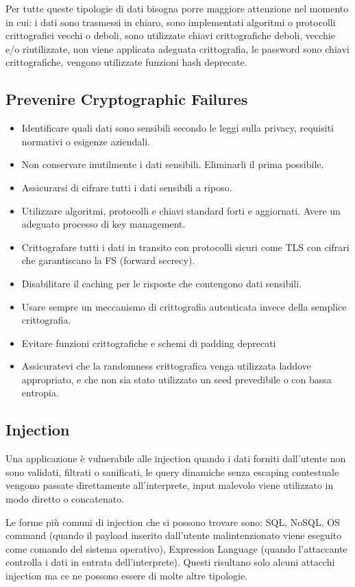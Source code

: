 Per tutte queste tipologie di dati bisogna porre maggiore attenzione nel momento in cui: i dati sono trasmessi in chiaro,  sono implementati algoritmi o protocolli crittografici vecchi o deboli,  sono utilizzate chiavi crittografiche deboli, vecchie e/o riutilizzate, non viene applicata adeguata crittografia, le password sono chiavi crittografiche, vengono utilizzate funzioni hash deprecate. 
\subsection{Prevenire Cryptographic Failures} 
\begin{itemize}
    \item Identificare quali dati sono sensibili secondo le leggi sulla privacy, requisiti normativi o esigenze aziendali.
    \item Non conservare inutilmente i dati sensibili. Eliminarli il prima possibile.
    \item Assicurarsi di cifrare tutti i dati sensibili a riposo.
    \item Utilizzare algoritmi, protocolli e chiavi standard forti e aggiornati. Avere un adeguato processo di key management.
    \item Crittografare tutti i dati in transito con protocolli sicuri come TLS con cifrari che garantiscano la FS (forward secrecy).
    \item Disabilitare il caching per le risposte che contengono dati sensibili.
    \item Usare sempre un meccanismo di crittografia autenticata invece della semplice crittografia.
    \item Evitare funzioni crittografiche e schemi di padding deprecati
    \item Assicuratevi che la randomness crittografica venga utilizzata laddove appropriato, e che non sia stato utilizzato un seed prevedibile o con bassa entropia.  
\end{itemize}
\subsection{Injection} 
Una applicazione è vulnerabile alle injection quando i dati forniti dall’utente non sono validati, filtrati o sanificati, le query dinamiche senza escaping contestuale vengono passate direttamente all’interprete, input malevolo viene utilizzato in modo diretto o concatenato. 

Le forme più comuni di injection che si possono trovare sono: SQL, NoSQL, OS command (quando il payload inserito dall'utente malintenzionato viene eseguito come comando del sistema operativo), Expression Language (quando l’attaccante controlla i dati in entrata dell’interprete). Questi risultano solo alcuni attacchi injection ma ce ne possono essere di molte altre tipologie.
